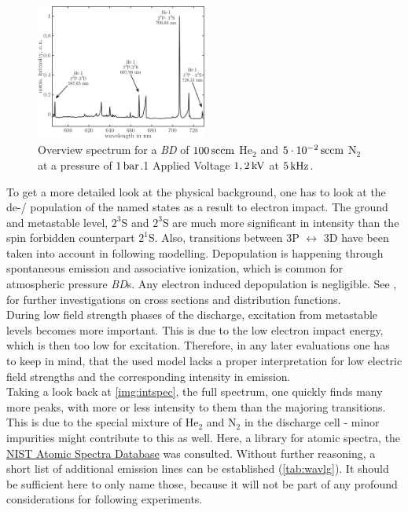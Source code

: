 \documentclass[a4paper,10pt,twoside]{article}
\newcommand{\tenpo}[1]{ 10^{#1}}
\newcommand{\tilt}[1]{\textit{#1}}
\begin{document}
				\begin{figure}[t]
					\centering
					\includegraphics[width=0.5\textwidth]{figures/results/int_spectrum}
					\caption{Overview spectrum for a \tilt{BD} of $\unit[100]{sccm}$ He$_2$ and $\unit[5\cdot\tenpo{-2}]{sccm}$ N$_2$ at a pressure of $\unit[1]{bar}$.1 Applied Voltage $\unit[1,2]{kV}$ at $\unit[5]{kHz}$.}
					\label{img:intspec}
				\end{figure}
			
			To get a more detailed look at the physical background, one has to look at the de-/ population of the named states as a result to electron impact. The ground and metastable level, $2^3$S and $2^3$S are much more significant in intensity than the spin forbidden counterpart $2^1$S. Also, transitions between 3P $\leftrightarrow$ 3D have been taken into account in following modelling. Depopulation is happening through spontaneous emission and associative ionization, which is common for atmospheric pressure \tilt{BD}s. Any electron induced depopulation is negligible. See \cite{PhysRevA.21.188}, \cite{0963-0252-14-4-011} for further investigations on cross sections and distribution functions.\\
			During low field strength phases of the discharge, excitation from metastable levels becomes more important. This is due to the low electron impact energy, which is then too low for excitation. Therefore, in any later evaluations one has to keep in mind, that the used model lacks a proper interpretation for low electric field strengths and the corresponding intensity in emission.\\
			Taking a look back at \autoref{img:intspec}, the full spectrum, one quickly finds many more peaks, with more or less intensity to them than the majoring transitions. This is due to the special mixture of He$_2$ and N$_2$ in the discharge cell - minor impurities might contribute to this as well. Here, a library for atomic spectra, the \href{http://physics.nist.gov/cgi-bin/ASD/lines1.pl}{NIST Atomic Spectra Database} was consulted. Without further reasoning, a short list of additional emission lines can be established (\autoref{tab:wavlg}). It should be sufficient here to only name those, because it will not be part of any profound considerations for following experiments.
		
\end{document}
